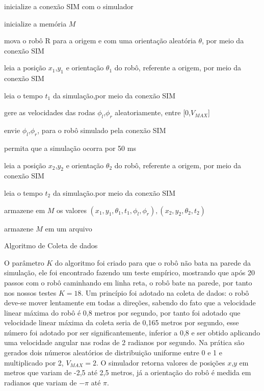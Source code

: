 \begin{algorithm}[H]
    \label{coleta:de:dados:}
    
    
    inicialize a conexão SIM  com o simulador

    inicialize a memória $M$

    mova o robô R para a origem e com uma orientação aleatória $\theta$,
    por meio da conexão SIM

     {
        leia a posição $x_1$,$y_1$  e orientação $\theta_{1}$ do robô,
        referente a origem, por meio da conexão SIM
        
        leia o tempo $t_1$ da simulação,por meio da conexão SIM
        
        gere as velocidades das rodas $\phi_l$,$\phi_r$ aleatoriamente,
        entre [0,$V_{MAX}$]
        
        envie  $\phi_l$,$\phi_r$, para o robô simulado pela conexão SIM

        permita que a simulação ocorra por 50 ms 

        leia a posição $x_2$,$y_2$  e orientação $\theta_{2}$ do robô,
        referente a origem, por meio da conexão SIM

        leia o tempo $t_2$ da simulação.por meio da conexão SIM

        
        armazene em $M$ os valores  $(x_1,y_1,\theta_{1},t_1,\phi_l,\phi_r),(x_2,y_2,\theta_{2},t_2)$
        
    }

    armazene $M$ em um arquivo
    
    \caption{Algoritmo de Coleta de dados}
    
\end{algorithm}

O parâmetro $K$ do algoritmo foi criado para que o robô não bata na parede
da simulação, ele foi encontrado fazendo um teste empírico, mostrando que
após 20 passos  com o robô caminhando em linha reta, o robô bate na parede,
por tanto nos nossos testes $K = 18$. Um princípio foi adotado na coleta
de dados: o robô deve-se mover lentamente em todas a direções, sabendo do
fato que a velocidade linear máxima do robô é 0,8 metros por segundo,
por tanto foi adotado que velocidade linear máxima da coleta seria de 
0,165 metros por segundo, esse número foi adotado por ser significantemente,
inferior a 0,8  e ser obtido aplicando uma velocidade angular nas rodas de 2
radianos por segundo. Na prática são gerados
dois números aleatórios de distribuição uniforme entre 0 e 1 e multiplicado por
2, $V_{MAX} = 2$. O simulador retorna valores de posições $x$,$y$ em metros
que variam de -2,5 até 2,5 metros, já a orientação do robô é medida em radianos
que variam de $-\pi$ até $\pi$.
